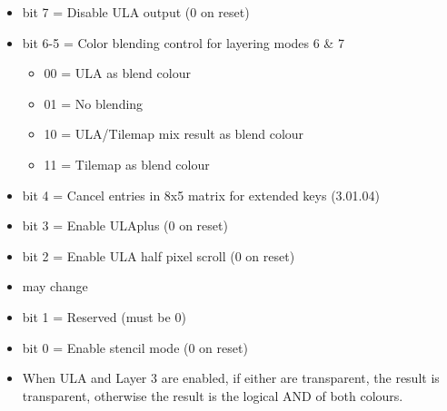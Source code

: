 \begin{itemize}
\item bit 7 = Disable ULA output (0 on reset)
\item bit 6-5 = Color blending control for layering modes 6 \& 7
\begin{itemize}
\item 00 = ULA as blend colour
\item 01 = No blending
\item 10 = ULA/Tilemap mix result as blend colour
\item 11 = Tilemap as blend colour
\end{itemize}
\item bit 4 = Cancel entries in 8x5 matrix for extended keys (3.01.04)
\item bit 3 = Enable ULAplus (0 on reset)
\item bit 2 = Enable ULA half pixel scroll (0 on reset)
\item[] may change
\item bit 1 = Reserved (must be 0)
\item bit 0 = Enable stencil mode (0 on reset)
\item[] When ULA and Layer 3 are enabled, if either are transparent,
  the result is transparent, otherwise the result is the logical AND
  of both colours.
\end{itemize}

